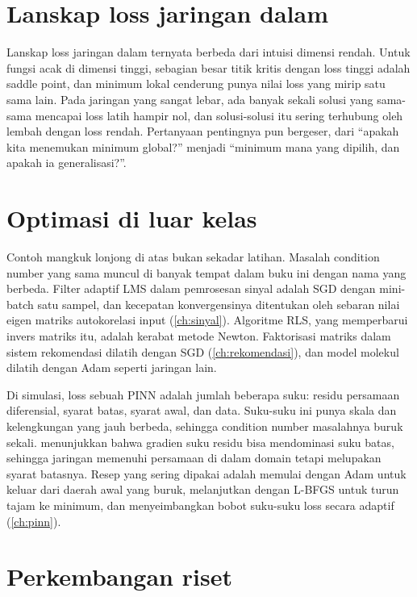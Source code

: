 \section{Lanskap loss jaringan dalam}

Lanskap loss jaringan dalam ternyata berbeda dari intuisi dimensi rendah. Untuk fungsi acak di
dimensi tinggi, sebagian besar titik kritis dengan loss tinggi adalah saddle point, dan
minimum lokal cenderung punya nilai loss yang mirip satu sama lain. Pada jaringan yang sangat
lebar, ada banyak sekali solusi yang sama-sama mencapai loss latih hampir nol, dan
solusi-solusi itu sering terhubung oleh lembah dengan loss rendah. Pertanyaan pentingnya pun
bergeser, dari ``apakah kita menemukan minimum global?'' menjadi ``minimum mana yang dipilih, dan
apakah ia generalisasi?''.

\section{Optimasi di luar kelas}

Contoh mangkuk lonjong di atas bukan sekadar latihan. Masalah condition number yang sama muncul di
banyak tempat dalam buku ini dengan nama yang berbeda. Filter adaptif LMS dalam pemrosesan sinyal adalah
SGD dengan mini-batch satu sampel, dan kecepatan konvergensinya ditentukan oleh sebaran nilai eigen
matriks autokorelasi input (\cref{ch:sinyal}). Algoritme RLS, yang memperbarui invers matriks itu, adalah
kerabat metode Newton. Faktorisasi matriks dalam sistem rekomendasi dilatih dengan SGD
(\cref{ch:rekomendasi}), dan model molekul dilatih dengan Adam seperti jaringan lain.

Di simulasi, loss sebuah PINN adalah jumlah beberapa suku: residu persamaan diferensial, syarat batas,
syarat awal, dan data. Suku-suku ini punya skala dan kelengkungan yang jauh berbeda, sehingga condition
number masalahnya buruk sekali. \citet{wang2021} menunjukkan bahwa gradien suku residu bisa mendominasi
suku batas, sehingga jaringan memenuhi persamaan di dalam domain tetapi melupakan syarat batasnya. Resep
yang sering dipakai adalah memulai dengan Adam untuk keluar dari daerah awal yang buruk, melanjutkan
dengan L-BFGS untuk turun tajam ke minimum, dan menyeimbangkan bobot suku-suku loss secara adaptif
(\cref{ch:pinn}).

\section{Perkembangan riset}

